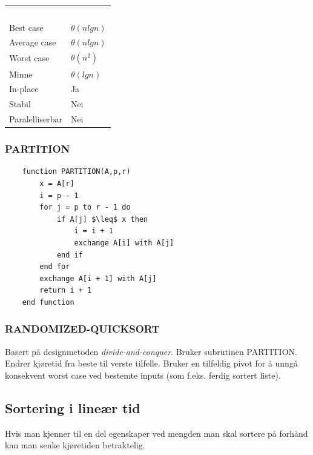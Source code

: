 \begin{table}[H]
    \label{tab:bubblesort}
    \centering
    \begin{tabular}{|L{15em} | L{15em}|}
        \hline
        \textbf{\textcolor{white}{Tilfelle}} & \textbf{\textcolor{white}{}}\\
        Best case & $\theta(n lg n)$\\
        Average case & $\theta(n lg n)$\\
        Worst case & $\theta(n^2)$\\
        Minne & $\theta(lg n)$\\
        In-place & Ja\\
        Stabil & Nei\\
        Paralelliserbar & Nei\\
         \hline
    \end{tabular}
\end{table}

\subsubsection{PARTITION}

\begin{lstlisting}
    function PARTITION(A,p,r)
	    x = A[r]
    	i = p - 1
    	for j = p to r - 1 do
    		if A[j] $\leq$ x then
    			i = i + 1
    			exchange A[i] with A[j]
    		end if
    	end for
    	exchange A[i + 1] with A[j]
    	return i + 1
    end function
\end{lstlisting}

\subsubsection{RANDOMIZED-QUICKSORT}
Basert på designmetoden \textit{divide-and-conquer}. Bruker subrutinen PARTITION. Endrer kjøretid fra beste til verste tilfelle. Bruker en tilfeldig pivot for å unngå konsekvent worst case ved bestemte inputs (som f.eks. ferdig sortert liste).

\subsection{Sortering i lineær tid}
Hvis man kjenner til en del egenskaper ved mengden man skal sortere på forhånd kan man senke kjøretiden betraktelig.

